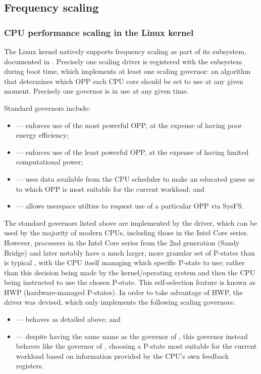 \subsection{Frequency scaling}

\subsubsection{CPU performance scaling in the Linux kernel}

The Linux kernel natively supports frequency scaling as part of its 
subsystem, documented in \cite{linuxCPUScaling}. Precisely one scaling driver is
registered with the subsystem during boot time, which implements at least one
scaling governor: an algorithm that determines which OPP each CPU core should be
set to use at any given moment. Precisely one governor is in use at any given time.

Standard governors include:
\begin{itemize}
    \item {} — enforces use of the most powerful OPP, at the
        expense of having poor energy efficiency;
    \item {} — enforces use of the least powerful OPP, at the
        expense of having limited computational power;
    \item {} — uses data available from the CPU scheduler to make
        an educated guess as to which OPP is most suitable for the current
        workload; and
    \item {} — allows userspace utilties to request use of a
        particular OPP via SysFS.
\end{itemize}

The standard governors listed above are implemented by the 
driver, which can be used by the majority of modern CPUs, including those in
the Intel Core series. However, processers in the Intel Core series from the
2nd generation (Sandy Bridge) and later notably have a much larger, more
granular set of P-states than is typical \cite{intelDevManual}, with the CPU
itself managing which specific P-state to use; rather than this decision being
made by the kernel/operating system and then the CPU being instructed to use 
the chosen P-state. This self-selection feature is known as HWP
(hardware-managed P-states). In order to take advantage of HWP, the
 driver \cite{linuxIntelPState} was devised, which only
implements the following scaling governors:
\begin{itemize}
    \item {} — behaves as detailed above; and
    \item {} — despite having the same name as the
         governor of , this governor instead
        behaves like the  governor of ,
        choosing a P-state most suitable for the current workload based on
        information provided by the CPU's own feedback registers.
\end{itemize}

